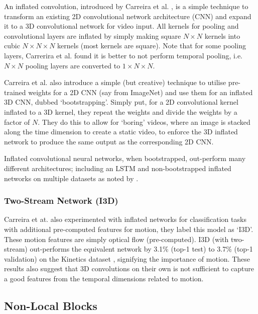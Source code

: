 \documentclass{report}
\theoremstyle{plain}
\theoremstyle{definition}
\theoremstyle{remark}
\numberwithin{equation}{section}
\numberwithin{figure}{section}
\newcommand{\<}{\langle}
\renewcommand{\>}{\rangle}
\begin{document}
An inflated convolution, introduced by Carreira et al. \cite{carreira_quo_2017}, is a simple technique to transform an existing 2D convolutional network architecture (CNN) and expand it to a 3D convolutional network for video input. All kernels for pooling and convolutional layers are inflated by simply making square $N \times N$ kernels into cubic $N \times N \times N$ kernels (most kernels are square). Note that for some pooling layers, Carrerira et al. \cite{carreira_quo_2017} found it is better to not perform temporal pooling, i.e. $N \times N$ pooling layers are converted to $1 \times N \times N$.

Carreira et al. \cite{carreira_quo_2017} also introduce a simple (but creative) technique to utilise pre-trained weights for a 2D CNN (say from ImageNet) and use them for an inflated 3D CNN, dubbed `bootstrapping'. Simply put, for a 2D convolutional kernel inflated to a 3D kernel, they repeat the weights and divide the weights by a factor of $N$. They do this to allow for `boring' videos, where an image is stacked along the time dimension to create a static video, to enforce the 3D inflated network to produce the same output as the corresponding 2D CNN. 

Inflated convolutional neural networks, when bootstrapped, out-perform many different architectures; including an LSTM and non-bootstrapped inflated networks on multiple datasets as noted by \cite{carreira_quo_2017}.

\subsubsection{Two-Stream Network (I3D)}

Carreira et at. \cite{carreira_quo_2017} also experimented with inflated networks for classification tasks with additional pre-computed features for motion, they label this model as `I3D'. These motion features are simply optical flow (pre-computed). I3D (with two-stream) out-performs the equivalent network by 3.1\% (top-1 test) to 3.7\% (top-1 validation) \cite{wang_non-local_2017} on the Kinetics dataset \cite{kay_kinetics_2017}, signifying the importance of motion. These results also suggest that 3D convolutions on their own is not sufficient to capture a good features from the temporal dimensions related to motion.

\subsection{Non-Local Blocks}
\end{document}
